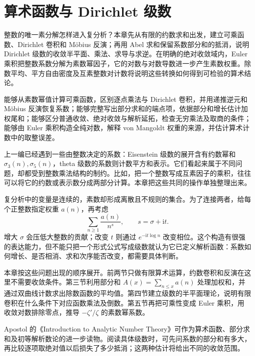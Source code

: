 \chapter{算术函数与 Dirichlet 级数}
\label{b3:ch:25}

\begin{chapterabstract}
整数的唯一素分解怎样进入复分析？本章先从有限的约数求和出发，建立可乘函数、Dirichlet 卷积和 Möbius 反演；再用 Abel 求和保留系数部分和的抵消，说明 Dirichlet 级数的收敛半平面、乘法、求导与求逆。在明确的绝对收敛域内，Euler 乘积把整数系数分解为素数幂因子，它的对数与对数导数进一步产生素数权重。除数平均、平方自由密度及互素整数对计数将说明这些转换如何得到可检验的算术结论。
\end{chapterabstract}

\begin{learninggoals}
能够从素数幂值计算可乘函数，区别逐点乘法与 Dirichlet 卷积，并用递推逆元和 Möbius 反演恢复系数；能够完整写出部分求和的端点项，依据部分和增长估计加权尾和；能够区分普通收敛、绝对收敛与解析延拓，检查无穷乘法及取商的条件；能够由 Euler 乘积构造全纯对数，解释 von Mangoldt 权重的来源，并估计算术计数中的取整误差。
\end{learninggoals}

上一编已经遇到一些由整数决定的系数：Eisenstein 级数的展开含有约数幂和 \(\sigma_3(n),\sigma_5(n)\)，theta 级数的系数则计数平方和表示。它们看起来属于不同问题，却都受到整数乘法结构的制约。比如，把一个整数写成互素因子的乘积，往往可以将它的约数或表示数分成两部分计算。本章把这些共同的操作单独整理出来。

复分析中的变量是连续的，素数却形成离散且不规则的集合。为了连接两者，给每个正整数指定权重 \(a(n)\)，再考虑
\[
 \sum_{n\ge1}\frac{a(n)}{n^s},\qquad s=\sigma+\mathrm it.
\]
增大 \(\sigma\) 会压低大整数的贡献；改变 \(t\) 则通过 \(e^{-\mathrm it\log n}\) 改变相位。这个构造有很强的表达能力，但不能只把一个形式公式写成级数就认为它已定义解析函数：系数如何增长、是否相消、求和次序能否改变，都需要具体判断。

本章按这些问题出现的顺序展开。前两节只做有限算术运算，约数卷积和反演在这里不需要收敛条件。第三节利用部分和 \(A(x)=\sum_{n\le x}a(n)\) 处理加权和，并通过双曲线计数求出除数函数的平均值。第四节建立级数的半平面理论，说明有限卷积在什么条件下对应函数乘法及倒数。第五节再把可乘性变成 Euler 乘积，用收敛对数排除零点，推导 \(-\zeta'/\zeta\) 的素数幂系数。

Apostol 的《Introduction to Analytic Number Theory》\cite{Apostol1976Introduction}可作为算术函数、部分求和及初等解析数论的进一步读物。阅读具体级数时，可先问系数的部分和有多大，再比较逐项取绝对值以后损失了多少抵消；这两种估计将给出不同的收敛范围。

